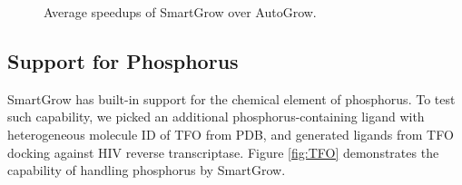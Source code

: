 \begin{figure}
\centering
{}
\caption{Average speedups of SmartGrow over AutoGrow.}
\label{fig:SynthesisSpeedup}
\end{figure}

\subsection{Support for Phosphorus}

SmartGrow has built-in support for the chemical element of phosphorus. To test such capability, we picked an additional phosphorus-containing ligand with heterogeneous molecule ID of TFO from PDB, and generated ligands from TFO docking against HIV reverse transcriptase. Figure \ref{fig:TFO} demonstrates the capability of handling phosphorus by SmartGrow.

